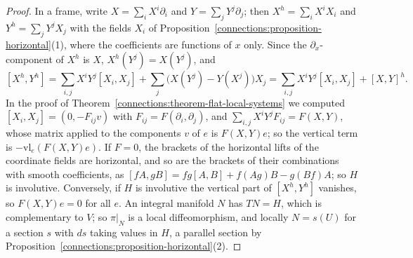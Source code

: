 \begin{proof}
In a frame, write $X = \sum_iX^i\partial_i$ and $Y = \sum_jY^j\partial_j$; then $X^h = \sum_iX^iX_i$ and $Y^h = \sum_jY^jX_j$ with the fields $X_i$ of
Proposition~\ref{connections:proposition-horizontal}(1), where the coefficients are functions of $x$ only. Since the $\partial_x$-component of $X^h$ is $X$, $X^h(Y^j) = X(Y^j)$, and
\[
[X^h, Y^h] = \sum_{i,j}X^iY^j[X_i, X_j] + \sum_j\bigl(X(Y^j) - Y(X^j)\bigr)X_j = \sum_{i,j}X^iY^j[X_i, X_j] + [X, Y]^h .
\]
In the proof of Theorem~\ref{connections:theorem-flat-local-systems} we computed $[X_i, X_j] = (0, -F_{ij}v)$ with $F_{ij} = F(\partial_i, \partial_j)$, and
$\sum_{i,j}X^iY^jF_{ij} = F(X, Y)$, whose matrix applied to the components $v$ of $e$ is $F(X, Y)e$; so the vertical term is $-\mathrm{vl}_e(F(X, Y)e)$. If $F = 0$, the brackets of the
horizontal lifts of the coordinate fields are horizontal, and so are the brackets of their combinations with smooth coefficients, as $[fA, gB] = fg[A, B] + f(Ag)B - g(Bf)A$; so $H$ is
involutive. Conversely, if $H$ is involutive the vertical part of $[X^h, Y^h]$ vanishes, so $F(X, Y)e = 0$ for all $e$. An integral manifold $N$ has $T N = H$, which is complementary to
$V$; so $\pi|_N$ is a local diffeomorphism, and locally $N = s(U)$ for a section $s$ with $ds$ taking values in $H$, a parallel section by
Proposition~\ref{connections:proposition-horizontal}(2).
\end{proof}

